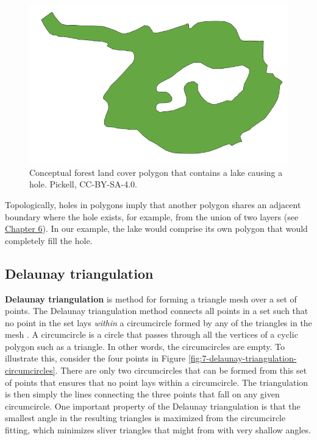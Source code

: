 \documentclass[
]{book}
\begin{document}
\begin{figure}
\includegraphics[width=0.5\linewidth]{images/07-hole} \caption{Conceptual forest land cover polygon that contains a lake causing a hole. Pickell, CC-BY-SA-4.0.}\label{fig:7-hole}
\end{figure}

Topologically, holes in polygons imply that another polygon shares an adjacent boundary where the hole exists, for example, from the union of two layers (see \href{https://ubc-geomatics-textbook.github.io/geomatics-textbook/overlay-and-proximity-analysis.html}{Chapter 6}). In our example, the lake would comprise its own polygon that would completely fill the hole.

\subsection{Delaunay triangulation}\label{delaunay-triangulation}

\textbf{Delaunay triangulation} is method for forming a triangle mesh over a set of points. The Delaunay triangulation method connects all points in a set such that no point in the set lays \emph{within} a circumcircle formed by any of the triangles in the mesh \citep{delaunay_sur_1934}. A circumcircle is a circle that passes through all the vertices of a cyclic polygon such as a triangle. In other words, the circumcircles are empty. To illustrate this, consider the four points in Figure \ref{fig:7-delaunay-triangulation-circumcircles}. There are only two circumcircles that can be formed from this set of points that ensures that no point lays within a circumcircle. The triangulation is then simply the lines connecting the three points that fall on any given circumcircle. One important property of the Delaunay triangulation is that the smallest angle in the resulting triangles is maximized from the circumcircle fitting, which minimizes sliver triangles that might from with very shallow angles.
\end{document}
